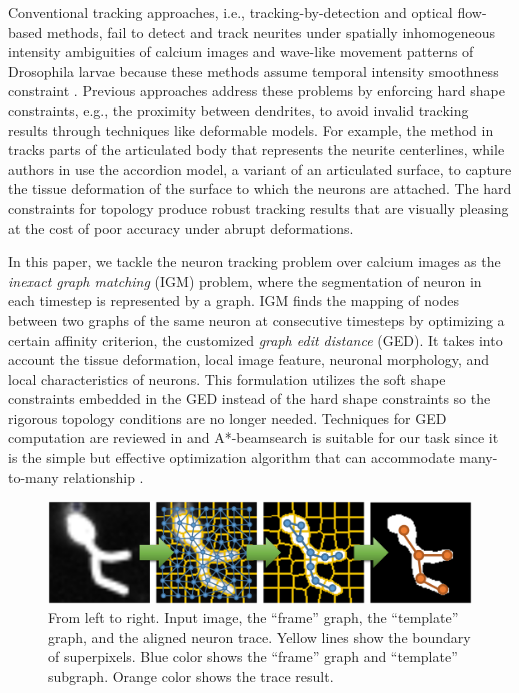 \documentclass{article}
\begin{document}
Conventional tracking approaches, i.e., tracking-by-detection \cite{Gulyanon2016, Glowacki2018} and optical flow-based \cite{Chen2016} methods, fail to detect and track neurites under spatially inhomogeneous intensity ambiguities of calcium images and wave-like movement patterns of Drosophila larvae because these methods assume temporal intensity smoothness constraint \cite{Gulyanon2018a}. Previous approaches address these problems by enforcing hard shape constraints, e.g., the proximity between dendrites, to avoid invalid tracking results through techniques like deformable models. For example, the method in \cite{Gulyanon2018a} tracks parts of the articulated body that represents the neurite centerlines, while authors in \cite{Gulyanon2019} use the accordion model, a variant of an articulated surface, to capture the tissue deformation of the surface to which the neurons are attached. The hard constraints for topology produce robust tracking results that are visually pleasing at the cost of poor accuracy under abrupt deformations. 

In this paper, we tackle the neuron tracking problem over calcium images as the \emph{inexact graph matching} (IGM) problem, where the segmentation of neuron in each timestep is represented by a graph. IGM finds the mapping of nodes between two graphs of the same neuron at consecutive timesteps by optimizing a certain affinity criterion, the customized \emph{graph edit distance} (GED). It takes into account the tissue deformation, local image feature, neuronal morphology, and local characteristics of neurons. This formulation utilizes the soft shape constraints embedded in the GED instead of the hard shape constraints so the rigorous topology conditions are no longer needed. Techniques for GED computation are reviewed in \cite{Yan2016, Gao2010} and A*-beamsearch is suitable for our task since it is the simple but effective optimization algorithm that can accommodate many-to-many relationship \cite{Morrison2015, Neuhaus2006}.

\begin{figure}[t!]
	\centering
	\vspace{-10pt}
	\includegraphics[width=\columnwidth]{img/method.png}
	\vspace{-20pt}
	\caption{\small{From left to right. Input image, the ``frame'' graph, the ``template'' graph, and the aligned neuron trace. Yellow lines show the boundary of superpixels. Blue color shows the ``frame'' graph and ``template'' subgraph. Orange color shows the trace result.}}
	\label{fig:method}
	\vspace{-10pt}
\end{figure}
\end{document}
